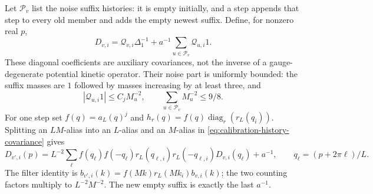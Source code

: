 \documentclass[11pt,reqno]{amsart}
\numberwithin{equation}{section}
\theoremstyle{definition}
\theoremstyle{remark}
\begin{document}
Let \(\mathcal P_v\) list the noise suffix histories: it is empty
initially, and a step appends that step to every old member and
adds the empty newest suffix. Define, for nonzero real \(p\),
\begin{equation}
 D_{v,i}=\mathcal Q_{v,i}\Delta_1^{-1}
                       +a^{-1}\sum_{u\in\mathcal P_v}\mathcal Q_{u,i}1.
 \label{eq:calibration-history-covariance}
\end{equation}
These diagonal coefficients are auxiliary covariances, not the
inverse of a gauge-degenerate potential kinetic operator.
Their noise part is uniformly bounded: the suffix masses are
\(1\) followed by masses increasing by at least three, and
\[
 |\mathcal Q_{u,i}1|\le C_jM_u^{-2},\qquad
                         \sum_{u\in\mathcal P_v}M_u^{-2}\le9/8.
\]
For one step set \(f(q)=a_L(q)^j\) and
\(h_r(q)=f(q)\operatorname{diag}_r(r_L(q_i))\).
Splitting an \(LM\)-alias into an \(L\)-alias and an
\(M\)-alias in \eqref{eq:calibration-history-covariance} gives
\begin{equation}
 D_{v',i}(p)=L^{-2}\sum_\ell f(q_\ell)f(-q_\ell)
       r_L(q_{\ell,i})r_L(-q_{\ell,i})D_{v,i}(q_\ell)+a^{-1},
 \qquad q_\ell=(p+2\pi\ell)/L.
 \label{eq:calibration-one-step-covariance}
\end{equation}
The filter identity is
\(b_{v',i}(k)=f(Mk)r_L(Mk_i)b_{v,i}(k)\); the two counting
factors multiply to \(L^{-2}M^{-2}\). The new empty suffix
is exactly the last \(a^{-1}\).
\end{document}
